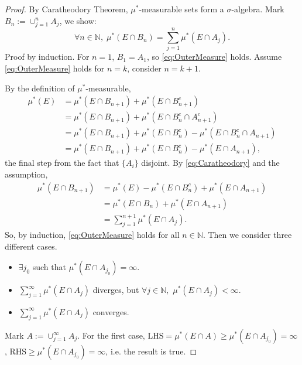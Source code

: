 \documentclass{article}
\newcommand{\cp}[1]{\cup_{#1=1}^{\infty}}
\newcommand{\sm}[1]{\sum_{#1=1}^{\infty}}
\begin{document}
\begin{proof}
    By Caratheodory Theorem, $\mu^{*}$-measurable sets 
    form a $\sigma$-algebra. 
    Mark $B_{n}:=\cup_{j=1}^{n}A_{j}$, 
    we show:
    \begin{equation}
        \label{eq:OuterMeasure}
        \forall n\in\mathbb{N},
        \;\mu^{*}(E\cap B_{n})
        =\sum_{j=1}^{n}\mu^{*}(E\cap A_{j}).
    \end{equation}
    Proof by induction. For $n=1$, $B_{1}=A_{1}$, 
    so \eqref{eq:OuterMeasure} holds. 
    Assume \eqref{eq:OuterMeasure} holds for $n=k$, consider $n=k+1$. 

    By the definition of $\mu^{*}$-measurable, 
    \begin{equation}
        \label{eq:Caratheodory}
        \begin{aligned}
            \mu^{*}(E)&=\mu^{*}(E\cap B_{n+1})
            +\mu^{*}(E\cap B_{n+1}^{c})\\
            &=\mu^{*}(E\cap B_{n+1})
            +\mu^{*}(E\cap B_{n}^{c}\cap A_{n+1}^{c})\\
            &=\mu^{*}(E\cap B_{n+1})+\mu^{*}(E\cap B_{n}^{c})
            -\mu^{*}(E\cap B_{n}^{c}\cap A_{n+1})\\
            &=\mu^{*}(E\cap B_{n+1})+\mu^{*}(E\cap B_{n}^{c})
            -\mu^{*}(E\cap A_{n+1}),
        \end{aligned}
    \end{equation}
    the final step from the fact that $\{A_{i}\}$ disjoint. 
    By \eqref{eq:Caratheodory} and the assumption,
    \begin{equation}
        \label{eq:Caratheodory2}
        \begin{aligned}
            \mu^{*}(E\cap B_{n+1})
            &=\mu^{*}(E)-\mu^{*}(E\cap B_{n}^{c})
            +\mu^{*}(E\cap A_{n+1})\\
            &=\mu^{*}(E\cap B_{n})+\mu^{*}(E\cap A_{n+1})\\
            &=\sum_{j=1}^{n+1}\mu^{*}(E\cap A_{j}).
        \end{aligned}
    \end{equation}
    So, by induction, \eqref{eq:OuterMeasure} 
    holds for all $n\in\mathbb{N}$.
    Then we consider three different cases.
    \begin{itemize}
        \item $\exists j_{0}$ such that 
        $\mu^{*}(E\cap A_{j_{0}})=\infty$.
        \item $\sm{j}\mu^{*}(E\cap A_{j})$ diverges, 
        but $\forall j\in\mathbb{N},$ $\mu^{*}(E\cap A_{j})<\infty$.
        \item $\sm{j}\mu^{*}(E\cap A_{j})$ converges.
    \end{itemize}
    Mark $A:=\cp{j}A_{j}$. 
    For the first case, 
    $\text{LHS}=\mu^{*}(E\cap A)\ge\mu^{*}(E\cap A_{j_0})
    =\infty$, $\text{RHS}\ge\mu^{*}(E\cap A_{j_{0}})=\infty$, 
    i.e. the result is true.


\end{proof}
\end{document}
